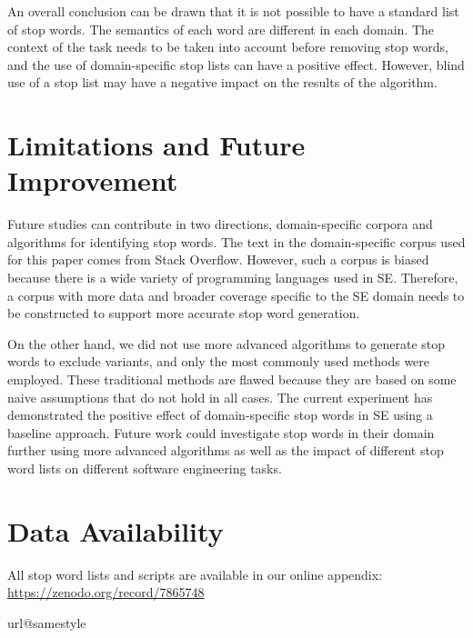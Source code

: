 \documentclass[conference]{IEEEtran}
\begin{document}
\begin{sloppy}
An overall conclusion can be drawn that it is not possible to have a standard list of stop words. The semantics of each word are different in each domain. The context of the task needs to be taken into account before removing stop words, and the use of domain-specific stop lists can have a positive effect. However, blind use of a stop list may have a negative impact on the results of the algorithm. 

\section{Limitations and Future Improvement}

Future studies can contribute in two directions, domain-specific corpora and algorithms for identifying stop words. The text in the domain-specific corpus used for this paper comes from Stack Overflow. However, such a corpus is biased because there is a wide variety of programming languages used in SE. Therefore, a corpus with more data and broader coverage specific to the SE domain needs to be constructed to support more accurate stop word generation. 
 
On the other hand, we did not use more advanced algorithms to generate stop words to exclude variants, and only the most commonly used methods were employed. These traditional methods are flawed because they are based on some naive assumptions that do not hold in all cases. The current experiment has demonstrated the positive effect of domain-specific stop words in SE using a baseline approach. Future work could investigate stop words in their domain further using more advanced algorithms as well as the impact of different stop word lists on different software engineering tasks.

\section{Data Availability}

All stop word lists and scripts are available in our online appendix: \url{https://zenodo.org/record/7865748}

\begin{thebibliography}{10}
\providecommand{\url}[1]{#1}
\csname url@samestyle\endcsname
\providecommand{\newblock}{\relax}
\providecommand{\bibinfo}[2]{#2}
\providecommand{\BIBentrySTDinterwordspacing}{\spaceskip=0pt\relax}
\providecommand{\BIBentryALTinterwordstretchfactor}{4}
\providecommand{\BIBentryALTinterwordspacing}{\spaceskip=\fontdimen2\font plus
\BIBentryALTinterwordstretchfactor\fontdimen3\font minus
  \fontdimen4\font\relax}
\providecommand{\BIBforeignlanguage}[2]{{%
\expandafter\ifx\csname l@#1\endcsname\relax
\typeout{** WARNING: IEEEtran.bst: No hyphenation pattern has been}%
\typeout{** loaded for the language `#1'. Using the pattern for}%
\typeout{** the default language instead.}%
\else
\language=\csname l@#1\endcsname
\fi
#2}}
\providecommand{\BIBdecl}{\relax}
\BIBdecl


\end{thebibliography}
\end{sloppy}
\end{document}
